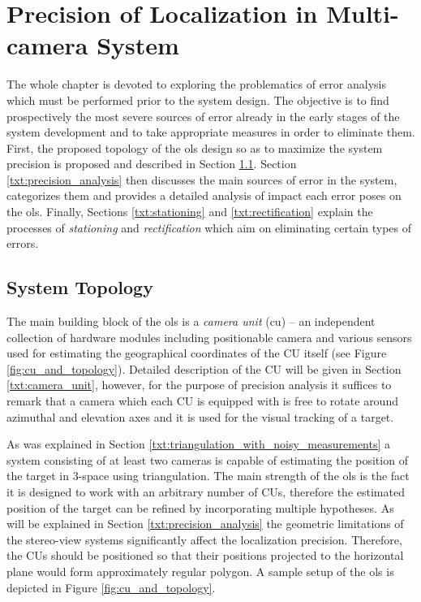 \chapter{Precision of Localization in Multi-camera System} \label{txt:precision_of_the_localization}

The whole chapter is devoted to exploring the problematics of error analysis which must be performed prior to the system design. The objective is to find prospectively the most severe sources of error already in the early stages of the system development and to take appropriate measures in order to eliminate them. First, the proposed topology of the \gls{ols} design so as to maximize the system precision is proposed and described in Section \ref{txt:system_topology}. Section \ref{txt:precision_analysis} then discusses the main sources of error in the system, categorizes them and provides a detailed analysis of impact each error poses on the \gls{ols}. Finally, Sections \ref{txt:stationing} and \ref{txt:rectification} explain the processes of \textit{stationing} and \textit{rectification} which aim on eliminating certain types of errors.

\section{System Topology} \label{txt:system_topology}

The main building block of the \gls{ols} is a \textit{camera unit} (\gls{cu}) -- an independent collection of hardware modules including positionable camera and various sensors used for estimating the geographical coordinates of the CU itself (see Figure \ref{fig:cu_and_topology}). Detailed description of the CU will be given in Section \ref{txt:camera_unit}, however, for the purpose of precision analysis it suffices to remark that a camera which each CU is equipped with is free to rotate around azimuthal and elevation axes and it is used for the visual tracking of a target.

As was explained in Section \ref{txt:triangulation_with_noisy_measurements} a system consisting of at least two cameras is capable of estimating the position of the target in 3-space using triangulation. The main strength of the \gls{ols} is the fact it is designed to work with an arbitrary number of CUs, therefore the estimated position of the target can be refined by incorporating multiple hypotheses. As will be explained in Section \ref{txt:precision_analysis} the geometric limitations of the stereo-view systems significantly affect the localization precision. Therefore, the CUs should be positioned so that their positions projected to the horizontal plane would form approximately regular polygon. A sample setup of the \gls{ols} is depicted in Figure \ref{fig:cu_and_topology}.

